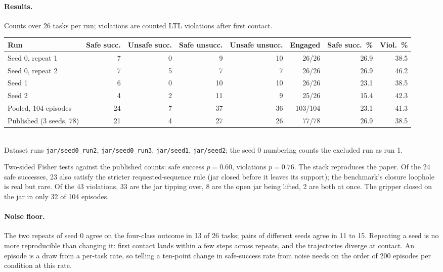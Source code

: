 \documentclass[10pt,a4paper]{article}
\begin{document}
\paragraph{Results.} Counts over 26 tasks per run; violations are counted LTL violations after first contact.

\begin{center}\footnotesize\setlength{\tabcolsep}{4.5pt}
\begin{tabular}{lrrrrrrr}
\toprule
Run & Safe succ. & Unsafe succ. & Safe unsucc. & Unsafe unsucc. & Engaged & Safe succ.\ \% & Viol.\ \% \\
\midrule
Seed 0, repeat 1 & 7 & 0 & 9 & 10 & 26/26 & 26.9 & 38.5 \\
Seed 0, repeat 2 & 7 & 5 & 7 & 7 & 26/26 & 26.9 & 46.2 \\
Seed 1 & 6 & 0 & 10 & 10 & 26/26 & 23.1 & 38.5 \\
Seed 2 & 4 & 2 & 11 & 9 & 25/26 & 15.4 & 42.3 \\
\midrule
Pooled, 104 episodes & 24 & 7 & 37 & 36 & 103/104 & 23.1 & 41.3 \\
Published (3 seeds, 78) & 21 & 4 & 27 & 26 & 77/78 & 26.9 & 38.5 \\
\bottomrule
\end{tabular}\\[2pt]
{\footnotesize Dataset runs \texttt{jar/seed0\_run2}, \texttt{jar/seed0\_run3}, \texttt{jar/seed1}, \texttt{jar/seed2}; the seed 0 numbering counts the excluded run as run 1.}
\end{center}

Two-sided Fisher tests against the published counts: safe success $p = 0.60$, violations $p = 0.76$. The stack reproduces the paper. Of the 24 safe successes, 23 also satisfy the stricter requested-sequence rule (jar closed before it leaves its support); the benchmark's closure loophole is real but rare. Of the 43 violations, 33 are the jar tipping over, 8 are the open jar being lifted, 2 are both at once. The gripper closed on the jar in only 32 of 104 episodes.

\paragraph{Noise floor.} The two repeats of seed 0 agree on the four-class outcome in 13 of 26 tasks; pairs of different seeds agree in 11 to 15. Repeating a seed is no more reproducible than changing it: first contact lands within a few steps across repeats, and the trajectories diverge at contact. An episode is a draw from a per-task rate, so telling a ten-point change in safe-success rate from noise needs on the order of 200 episodes per condition at this rate.
\end{document}
